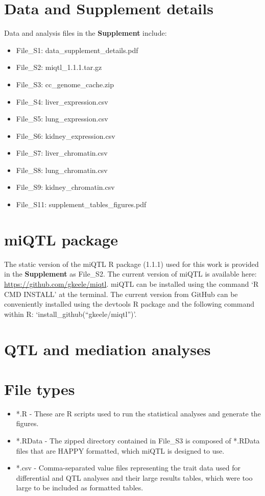\documentclass[9pt,twocolumn,twoside]{gsajnl}
\begin{document}
\clearpage

\section{Data and Supplement details}

Data and analysis files in the \textbf{Supplement} include:

\begin{itemize}
	\item File\_S1: data\_supplement\_details.pdf
	\item File\_S2: miqtl\_1.1.1.tar.gz
	\item File\_S3: cc\_genome\_cache.zip
	\item File\_S4: liver\_expression.csv
	\item File\_S5: lung\_expression.csv
	\item File\_S6: kidney\_expression.csv
	\item File\_S7: liver\_chromatin.csv
	\item File\_S8: lung\_chromatin.csv
	\item File\_S9: kidney\_chromatin.csv
	\item File\_S11: supplement\_tables\_figures.pdf
\end{itemize}

\section{miQTL package}

The static version of the miQTL R package (1.1.1) used for this work is provided in the \textbf{Supplement} as File\_S2. The current version of miQTL is available here: \url{https://github.com/gkeele/miqtl}. miQTL can be installed using the command `R CMD INSTALL' at the terminal. The current version from GitHub can be conveniently installed using the devtools R package and the following command within R: `install\_github(``gkeele/miqtl'')'.

\section{QTL and mediation analyses}

\section{File types}

\begin{itemize}
	\item *.R - These are R scripts used to run the statistical analyses and generate the figures.
	\item *.RData - The zipped directory contained in File\_S3 is composed of *.RData files that are HAPPY formatted, which miQTL is designed to use.
	\item *.csv - Comma-separated value files representing the trait data used for differential and QTL analyses and their large results tables, which were too large to be included as formatted tables.
\end{itemize}
\end{document}

